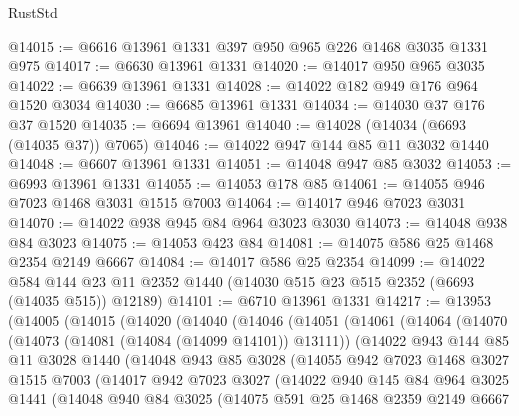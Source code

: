 \begin{lexlean}{RustStd}
\begin{coremodule}
@14015 := @6616 @13961 @1331 @397 @950 @965 @226 @1468 @3035 @1331 @975
@14017 := @6630 @13961 @1331
@14020 := @14017 @950 @965 @3035
@14022 := @6639 @13961 @1331
@14028 := @14022 @182 @949 @176 @964 @1520 @3034
@14030 := @6685 @13961 @1331
@14034 := @14030 @37 @176 @37 @1520
@14035 := @6694 @13961
@14040 := @14028 (@14034 (@6693 (@14035 @37)) @7065)
@14046 := @14022 @947 @144 @85 @11 @3032 @1440
@14048 := @6607 @13961 @1331
@14051 := @14048 @947 @85 @3032
@14053 := @6993 @13961 @1331
@14055 := @14053 @178 @85
@14061 := @14055 @946 @7023 @1468 @3031 @1515 @7003
@14064 := @14017 @946 @7023 @3031
@14070 := @14022 @938 @945 @84 @964 @3023 @3030
@14073 := @14048 @938 @84 @3023
@14075 := @14053 @423 @84
@14081 := @14075 @586 @25 @1468 @2354 @2149 @6667
@14084 := @14017 @586 @25 @2354
@14099 := @14022
    @584
    @144
    @23
    @11
    @2352
    @1440
    (@14030 @515 @23 @515 @2352 (@6693 (@14035 @515)) @12189)
@14101 := @6710 @13961 @1331
@14217 := @13953
    (@14005
      (@14015
        (@14020
          (@14040
            (@14046
              (@14051
                (@14061
                  (@14064
                    (@14070
                      (@14073 (@14081 (@14084 (@14099 @14101)) @13111))
                      (@14022
                        @943
                        @144
                        @85
                        @11
                        @3028
                        @1440
                        (@14048
                          @943
                          @85
                          @3028
                          (@14055
                            @942
                            @7023
                            @1468
                            @3027
                            @1515
                            @7003
                            (@14017
                              @942
                              @7023
                              @3027
                              (@14022
                                @940
                                @145
                                @84
                                @964
                                @3025
                                @1441
                                (@14048
                                  @940
                                  @84
                                  @3025
                                  (@14075
                                    @591
                                    @25
                                    @1468
                                    @2359
                                    @2149
                                    @6667

\end{coremodule}
\end{lexlean}
